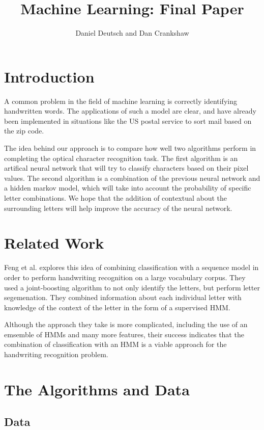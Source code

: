 \documentclass[11pt,a4paper,twocolumn]{article}
\author{Daniel Deutsch and Dan Crankshaw}
\title{Machine Learning: Final Paper}
\date{}
\begin{document}
\maketitle

\section{Introduction}

A common problem in the field of machine learning is correctly identifying
handwritten words. The applications of
such a model are clear, and have already been implemented in situations like
the US postal service to sort mail based on the zip code.

The idea behind our approach is to compare how well two algorithms perform in
completing the optical character recognition task. The first algorithm is an
artifical neural network that will try to classify characters based on
their pixel values. The second algorithm is a combination of the previous
neural network and a hidden markov model, which will take into account the
probability of specific letter combinations. We hope that the addition of contextual
about the surrounding letters will help improve the accuracy of the neural
network.

\section{Related Work}

Feng et al.\cite{feng2008hidden} explores this idea of combining classification with a sequence
model in order to perform handwriting recognition on a large vocabulary corpus. They used a
joint-boosting algorithm to not only identify the letters, but perform letter segemenation. They
combined information about each individual letter with knowledge of the context of the letter in the
form of a supervised HMM.

Although the approach they take is more complicated, including the use of an emsemble of HMMs and
many more features, their success indicates that the combination of classification with an HMM is a
viable approach for the handwriting recognition problem.

\section{The Algorithms and Data}

\subsection*{Data}
\end{document}
